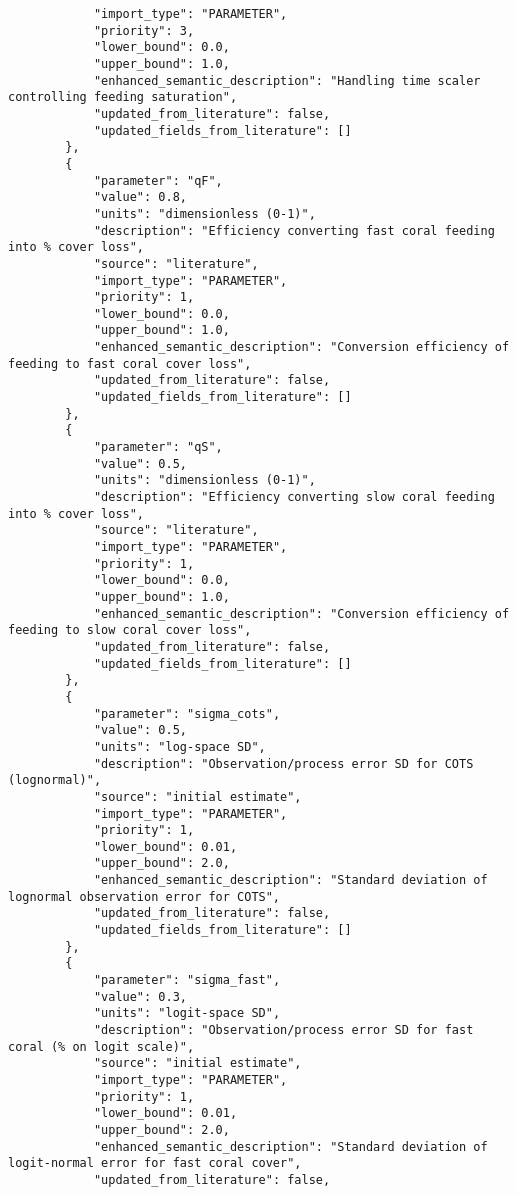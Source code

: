 \begin{lstlisting}
            "import_type": "PARAMETER",
            "priority": 3,
            "lower_bound": 0.0,
            "upper_bound": 1.0,
            "enhanced_semantic_description": "Handling time scaler controlling feeding saturation",
            "updated_from_literature": false,
            "updated_fields_from_literature": []
        },
        {
            "parameter": "qF",
            "value": 0.8,
            "units": "dimensionless (0-1)",
            "description": "Efficiency converting fast coral feeding into % cover loss",
            "source": "literature",
            "import_type": "PARAMETER",
            "priority": 1,
            "lower_bound": 0.0,
            "upper_bound": 1.0,
            "enhanced_semantic_description": "Conversion efficiency of feeding to fast coral cover loss",
            "updated_from_literature": false,
            "updated_fields_from_literature": []
        },
        {
            "parameter": "qS",
            "value": 0.5,
            "units": "dimensionless (0-1)",
            "description": "Efficiency converting slow coral feeding into % cover loss",
            "source": "literature",
            "import_type": "PARAMETER",
            "priority": 1,
            "lower_bound": 0.0,
            "upper_bound": 1.0,
            "enhanced_semantic_description": "Conversion efficiency of feeding to slow coral cover loss",
            "updated_from_literature": false,
            "updated_fields_from_literature": []
        },
        {
            "parameter": "sigma_cots",
            "value": 0.5,
            "units": "log-space SD",
            "description": "Observation/process error SD for COTS (lognormal)",
            "source": "initial estimate",
            "import_type": "PARAMETER",
            "priority": 1,
            "lower_bound": 0.01,
            "upper_bound": 2.0,
            "enhanced_semantic_description": "Standard deviation of lognormal observation error for COTS",
            "updated_from_literature": false,
            "updated_fields_from_literature": []
        },
        {
            "parameter": "sigma_fast",
            "value": 0.3,
            "units": "logit-space SD",
            "description": "Observation/process error SD for fast coral (% on logit scale)",
            "source": "initial estimate",
            "import_type": "PARAMETER",
            "priority": 1,
            "lower_bound": 0.01,
            "upper_bound": 2.0,
            "enhanced_semantic_description": "Standard deviation of logit-normal error for fast coral cover",
            "updated_from_literature": false,

\end{lstlisting}
